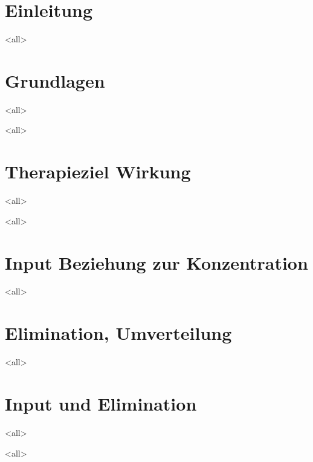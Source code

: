 \mode*
\section{Einleitung}
\mode<all>

\section{Grundlagen}
\mode<all>

\mode<all>

\pagebreak
\section{Therapieziel Wirkung}
\mode<all>

\mode<all>

\section{Input Beziehung zur Konzentration}
\mode<all>

\section{Elimination, Umverteilung}
\mode<all>

\section{Input und Elimination}
\mode<all>

\mode<all>

